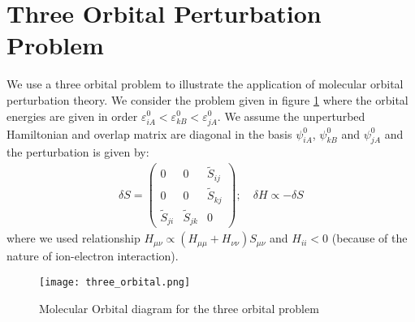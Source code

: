 \documentclass{article}
\begin{document}
\section{Three Orbital Perturbation Problem}
We use a three orbital problem to illustrate the application of molecular orbital 
perturbation theory. We consider the problem given in figure \ref{F:three_orbital}
where the orbital energies are given in order 
$\varepsilon_{iA}^0 < \varepsilon_{kB}^0 <\varepsilon_{jA}^0$. We assume the unperturbed 
Hamiltonian and overlap matrix are diagonal in the basis $\psi_{iA}^0$, $\psi_{kB}^0$ and $\psi_{jA}^0$
and the perturbation is given by:
\begin{align}
    \delta S = \left(\begin{matrix}
        0 & 0 & \tilde{S}_{ij} \\
        0 & 0 & \tilde{S}_{kj} \\
        \tilde{S}_{ji} & \tilde{S}_{jk} & 0 
    \end{matrix}\right) ; \quad \delta H \propto - \delta S
\end{align}
where we used relationship $H_{\mu\nu} \propto (H_{\mu\mu} + H_{\nu\nu}) S_{\mu\nu} $
and $H_{ii} < 0$ (because of the nature of ion-electron interaction). 

\begin{figure}[h!]
    \centering
    \texttt{[image: three\_orbital.png]}
    \caption{Molecular Orbital diagram for the three orbital problem}
    \label{F:three_orbital}
\end{figure}
\end{document}
